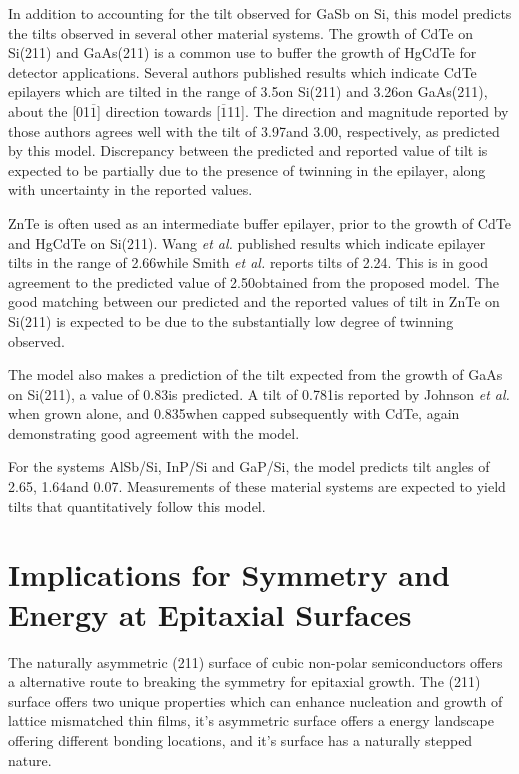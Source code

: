 In addition to accounting for the tilt observed for GaSb on Si, this model predicts the tilts observed in several other material systems. The growth of CdTe on Si(211) and GaAs(211) is a common use to buffer the growth of HgCdTe for detector applications. Several authors\cite{Triboulet2009,Yu1999,Lange1991} published results which indicate CdTe epilayers which are tilted in the range of 3.5\degree on Si(211)\cite{Zhao2011} and 3.26\degree on GaAs(211)\cite{Johnson2011}, about the [01$\overline{1}$] direction towards [$\overline{1}$11]. The direction and magnitude reported by those authors agrees well with the tilt of 3.97\degree and 3.00\degree, respectively, as predicted by this model. Discrepancy between the predicted and reported value of tilt is expected to be partially due to the presence of twinning in the epilayer, along with uncertainty in the reported values.

ZnTe is often used as an intermediate buffer epilayer, prior to the growth of CdTe and HgCdTe on Si(211).\cite{Zhao2011,Dhar1997a} Wang \textit{et al.}\cite{Wang2011a} published results which indicate epilayer tilts in the range of 2.66\degree while Smith \textit{et al.}\cite{smith2012_znte} reports tilts of 2.24\degree. This is in good agreement to the predicted value of 2.50\degree obtained from the proposed model. The good matching between our predicted and the reported values of tilt in ZnTe on Si(211) is expected to be due to the substantially low degree of twinning observed.

The model also makes a prediction of the tilt expected from the growth of GaAs on Si(211), a value of 0.83\degree is predicted. A tilt of 0.781\degree is reported by Johnson \textit{et al.}\cite{Johnson2011} when grown alone, and 0.835\degree when capped subsequently with CdTe, again demonstrating good agreement with the model.

For the systems AlSb/Si, InP/Si and GaP/Si, the model predicts tilt angles of 2.65\degree, 1.64\degree and 0.07\degree. Measurements of these material systems are expected to yield tilts that quantitatively follow this model.
\section{Implications for Symmetry and Energy at Epitaxial Surfaces}
The naturally asymmetric (211) surface of cubic non-polar semiconductors offers a 
alternative route to breaking the symmetry for epitaxial growth. The (211) surface offers 
two unique properties which can enhance nucleation and growth of lattice mismatched thin 
films, it's asymmetric surface offers a energy landscape offering different bonding 
locations, and it's surface has a naturally stepped nature.

